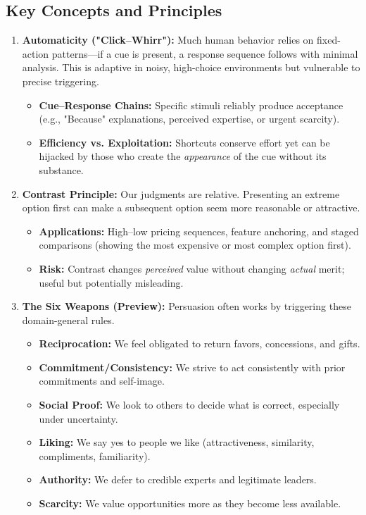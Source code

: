 \subsection*{Key Concepts and Principles}
\begin{enumerate}
    \item \textbf{Automaticity ("Click–Whirr"):} Much human behavior relies on fixed-action patterns—if a cue is present, a response sequence follows with minimal analysis. This is adaptive in noisy, high-choice environments but vulnerable to precise triggering.
    \begin{itemize}
        \item \textbf{Cue–Response Chains:} Specific stimuli reliably produce acceptance (e.g., "Because" explanations, perceived expertise, or urgent scarcity).
        \item \textbf{Efficiency vs. Exploitation:} Shortcuts conserve effort yet can be hijacked by those who create the \emph{appearance} of the cue without its substance.
    \end{itemize}

    \item \textbf{Contrast Principle:} Our judgments are relative. Presenting an extreme option first can make a subsequent option seem more reasonable or attractive.
    \begin{itemize}
        \item \textbf{Applications:} High–low pricing sequences, feature anchoring, and staged comparisons (showing the most expensive or most complex option first).
        \item \textbf{Risk:} Contrast changes \emph{perceived} value without changing \emph{actual} merit; useful but potentially misleading.
    \end{itemize}

    \item \textbf{The Six Weapons (Preview):} Persuasion often works by triggering these domain-general rules.
    \begin{itemize}
        \item \textbf{Reciprocation:} We feel obligated to return favors, concessions, and gifts.
        \item \textbf{Commitment/Consistency:} We strive to act consistently with prior commitments and self-image.
        \item \textbf{Social Proof:} We look to others to decide what is correct, especially under uncertainty.
        \item \textbf{Liking:} We say yes to people we like (attractiveness, similarity, compliments, familiarity).
        \item \textbf{Authority:} We defer to credible experts and legitimate leaders.
        \item \textbf{Scarcity:} We value opportunities more as they become less available.
    \end{itemize}


\end{enumerate}
